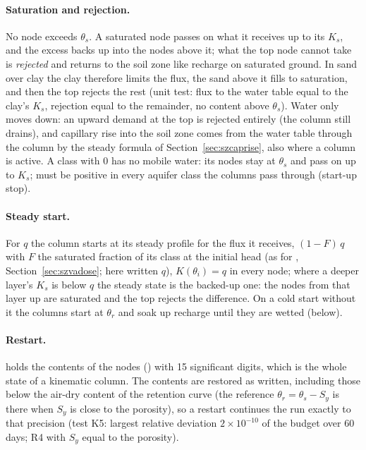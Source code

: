 \paragraph{Saturation and rejection.} No node exceeds $\theta_s$. A saturated node passes on what it receives up to its
$K_s$, and the excess backs up into the nodes above it; what the top node cannot take is \emph{rejected} and returns to
the soil zone like recharge on saturated ground. In sand over clay the clay therefore limits the flux, the sand above
it fills to saturation, and then the top rejects the rest (unit test: flux to the water table equal to the clay's
$K_s$, rejection equal to the remainder, no content above $\theta_s$). Water only moves down: an upward demand at the
top is rejected entirely (the column still drains), and capillary rise into the soil zone comes from the water table
through the column by the steady formula of Section~\ref{sec:szcaprise}, also where a column is active. A class with
 0 has no mobile water: its nodes stay at $\theta_s$ and pass on up to $K_s$;  must be
positive in every aquifer class the columns pass through (start-up stop).

\paragraph{Steady start.} For  $q$ the column starts at its steady profile for the
flux it receives, $(1-F)\,q$ with $F$ the saturated fraction of its class at the initial head (as for ,
Section~\ref{sec:szvadose}; here written $q$), $K(\theta_i)=q$ in every node; where a deeper layer's $K_s$ is below $q$ the steady state is the backed-up one: the nodes
from that layer up are saturated and the top rejects the difference. On a cold start without it the columns start
at $\theta_r$ and soak up recharge until they are wetted (below).

\paragraph{Restart.}  holds the contents of the nodes () with 15 significant
digits, which is the whole state of a kinematic column. The contents are restored as written, including those below the
air-dry content of the retention curve (the reference $\theta_r=\theta_s-S_y$ is there when $S_y$ is close to the
porosity), so a restart continues the run exactly to that precision (test K5: largest relative deviation
$2\times10^{-10}$ of the budget over 60 days;  R4 with $S_y$ equal to the porosity).

